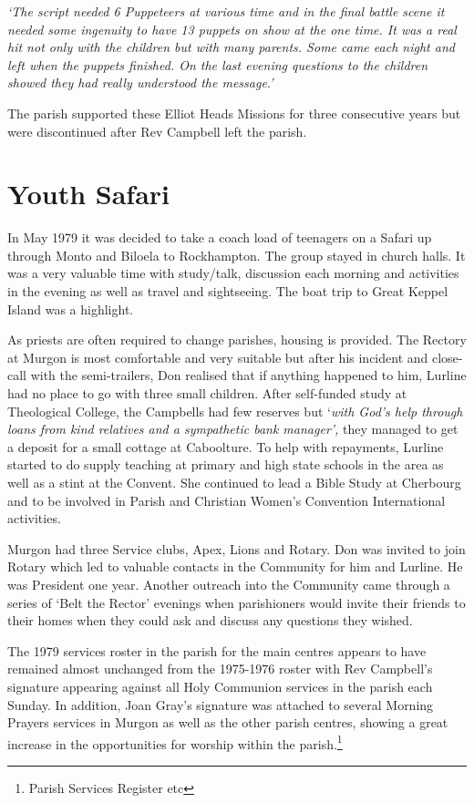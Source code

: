 \emph{`The script needed 6 Puppeteers at various time and in the final battle scene it needed some ingenuity to have 13 puppets on show at the one time. It was a real hit not only with the children but with many parents. Some came each night and left when the puppets finished. On the last evening questions to the children showed they had really understood the message.'}

The parish supported these Elliot Heads Missions for three consecutive years but were discontinued after Rev Campbell left the parish.

\hypertarget{youth-safari}{%
\section{Youth Safari}\label{youth-safari}}

In May 1979 it was decided to take a coach load of teenagers on a Safari up through Monto and Biloela to Rockhampton. The group stayed in church halls. It was a very valuable time with study/talk, discussion each morning and activities in the evening as well as travel and sightseeing. The boat trip to Great Keppel Island was a highlight.

As priests are often required to change parishes, housing is provided. The Rectory at Murgon is most comfortable and very suitable but after his incident and close-call with the semi-trailers, Don realised that if anything happened to him, Lurline had no place to go with three small children. After self-funded study at Theological College, the Campbells had few reserves but `\emph{with God's help through loans from kind relatives and a sympathetic bank manager',} they managed to get a deposit for a small cottage at Caboolture. To help with repayments, Lurline started to do supply teaching at primary and high state schools in the area as well as a stint at the Convent. She continued to lead a Bible Study at Cherbourg and to be involved in Parish and Christian Women's Convention International activities.

Murgon had three Service clubs, Apex, Lions and Rotary. Don was invited to join Rotary which led to valuable contacts in the Community for him and Lurline. He was President one year. Another outreach into the Community came through a series of `Belt the Rector' evenings when parishioners would invite their friends to their homes when they could ask and discuss any questions they wished.

The 1979 services roster in the parish for the main centres appears to have remained almost unchanged from the 1975-1976 roster with Rev Campbell's signature appearing against all Holy Communion services in the parish each Sunday. In addition, Joan Gray's signature was attached to several Morning Prayers services in Murgon as well as the other parish centres, showing a great increase in the opportunities for worship within the parish.\footnote{Parish Services Register etc}

